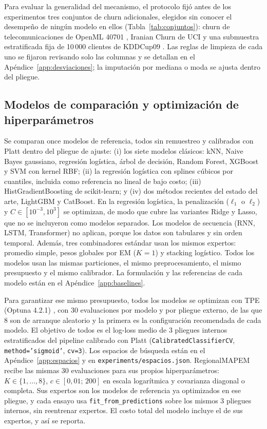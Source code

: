 \documentclass[11pt,a4paper]{article}
\begin{document}
Para evaluar la generalidad del mecanismo, el protocolo fijó antes de los experimentos tres conjuntos de churn adicionales, elegidos sin conocer el desempeño de ningún modelo en ellos (Tabla~\ref{tab:conjuntos}): churn de telecomunicaciones de OpenML 40701 \cite{vanschoren2014}, Iranian Churn de UCI \cite{iranian_uci} y una submuestra estratificada fija de 10\,000 clientes de KDDCup09 \cite{guyon2010}. Las reglas de limpieza de cada uno se fijaron revisando solo las columnas y se detallan en el Apéndice~\ref{app:desviaciones}; la imputación por mediana o moda se ajusta dentro del pliegue.

\subsection{Modelos de comparación y optimización de hiperparámetros}
Se comparan once modelos de referencia, todos sin remuestreo y calibrados con Platt dentro del pliegue de ajuste: (i) los siete modelos clásicos: kNN, Naive Bayes gaussiano, regresión logística, árbol de decisión, Random Forest, XGBoost y SVM con kernel RBF; (ii) la regresión logística con splines cúbicos por cuantiles, incluida como referencia no lineal de bajo costo; (iii) HistGradientBoosting de scikit-learn; y (iv) dos métodos recientes del estado del arte, LightGBM y CatBoost. En la regresión logística, la penalización ($\ell_1$ o $\ell_2$) y $C\in[10^{-3},10^{3}]$ se optimizan, de modo que cubre las variantes Ridge y Lasso, que no se incluyeron como modelos separados. Los modelos de secuencia (RNN, LSTM, Transformer) no aplican, porque los datos son tabulares y sin orden temporal. Además, tres combinadores estándar usan los mismos expertos: promedio simple, pesos globales por EM ($K=1$) y stacking logístico. Todos los modelos usan las mismas particiones, el mismo preprocesamiento, el mismo presupuesto y el mismo calibrador. La formulación y las referencias de cada modelo están en el Apéndice~\ref{app:baselines}.

Para garantizar ese mismo presupuesto, todos los modelos se optimizan con TPE (Optuna 4.2.1) \cite{bergstra2011,akiba2019}, con 30 evaluaciones por modelo y por pliegue externo, de las que 8 son de arranque aleatorio y la primera es la configuración recomendada de cada modelo. El objetivo de todos es el log-loss medio de 3 pliegues internos estratificados del pipeline calibrado con Platt (\texttt{CalibratedClassifierCV}, \texttt{method='sigmoid'}, \texttt{cv=3}). Los espacios de búsqueda están en el Apéndice~\ref{app:espacios} y en \texttt{experiments/espacios.json}. RegionalMAPEM recibe las mismas 30 evaluaciones para sus propios hiperparámetros: $K\in\{1,\dots,8\}$, $c\in[0{,}01;\,200]$ en escala logarítmica y covarianza diagonal o completa. Sus expertos son los modelos de referencia ya optimizados en ese pliegue, y cada ensayo usa \texttt{fit\_from\_predictions} sobre los mismos 3 pliegues internos, sin reentrenar expertos. El costo total del modelo incluye el de sus expertos, y así se reporta.
\end{document}
